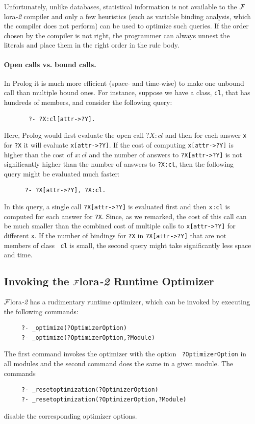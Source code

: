 \documentclass[11pt]{article}
\newcommand{\FLORA}{{\mbox{\sc ${\cal F}${lora}\rm\emph{-2}}}\xspace}
\begin{document}
Unfortunately, unlike databases, statistical information is not
available to the \FLORA compiler and only a few heuristics (such as
variable binding analysis, which the compiler does not perform) can be used
to optimize such queries. If the order chosen by the compiler is not right,
the programmer can always unnest the literals and place them in the right
order in the rule body.

\paragraph{Open calls vs. bound calls.}
In Prolog it is much more efficient (space- and
time-wise) to make one unbound call than multiple bound ones. For instance,
suppose we have a class, {\tt cl}, that has hundreds of members, and
consider the following query:
\begin{verbatim}
       ?- ?X:cl[attr->?Y].  
\end{verbatim}
Here, Prolog would first evaluate the open call $?X:cl$ and then for each
answer {\tt x} for {\tt ?X} it will evaluate {\tt x[attr->?Y]}.
If the cost of computing {\tt x[attr->?Y]} is higher than the cost of $x:cl$
and the number of answers to {\tt ?X[attr->?Y]} is not significantly
higher than the number of answers to {\tt ?X:cl}, then the following query
might be evaluated much faster:
\begin{verbatim}
      ?- ?X[attr->?Y], ?X:cl.  
\end{verbatim}
In this query, a single call {\tt ?X[attr->?Y]} is evaluated first and then
{\tt x:cl} is computed for each answer for {\tt ?X}.  Since, as we remarked,
the cost of this call can be much smaller than the combined cost of
multiple calls to {\tt x[attr->?Y]} for different {\tt x}.  If the number of
bindings for {\tt ?X} in {\tt ?X[attr->?Y]} that are not members of class {\tt
  cl} is small, the second query might take significantly less space and
time.

\subsection{Invoking the \FLORA Runtime Optimizer}
\label{sec-runtime-optimizer}

\FLORA has a rudimentary runtime optimizer, which can be invoked by
executing the following commands:
\begin{verbatim}
     ?- _optimize(?OptimizerOption)  
     ?- _optimize(?OptimizerOption,?Module)  
\end{verbatim}
The first command invokes the optimizer with the option {\tt
  ?OptimizerOption} in all modules and the second command does the same in a
given module. The commands
\begin{verbatim}
     ?- _resetoptimization(?OptimizerOption)  
     ?- _resetoptimization(?OptimizerOption,?Module)    
\end{verbatim}
disable the corresponding optimizer options.
\end{document}
